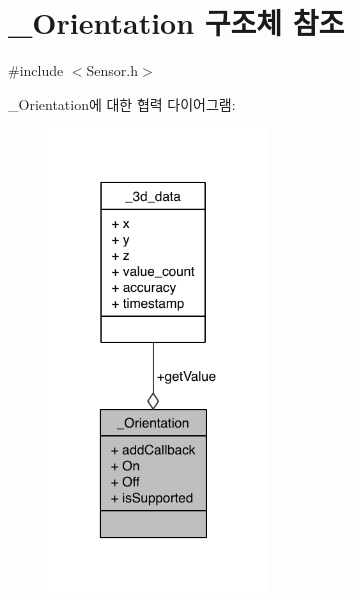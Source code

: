 \hypertarget{struct___orientation}{\section{\-\_\-\-Orientation 구조체 참조}
\label{struct___orientation}
}


{\ttfamily \#include $<$Sensor.\-h$>$}



\-\_\-\-Orientation에 대한 협력 다이어그램\-:
\nopagebreak
\begin{figure}[H]
\begin{center}
\leavevmode
\includegraphics[width=166pt]{df/d26/struct___orientation__coll__graph}
\end{center}
\end{figure}
